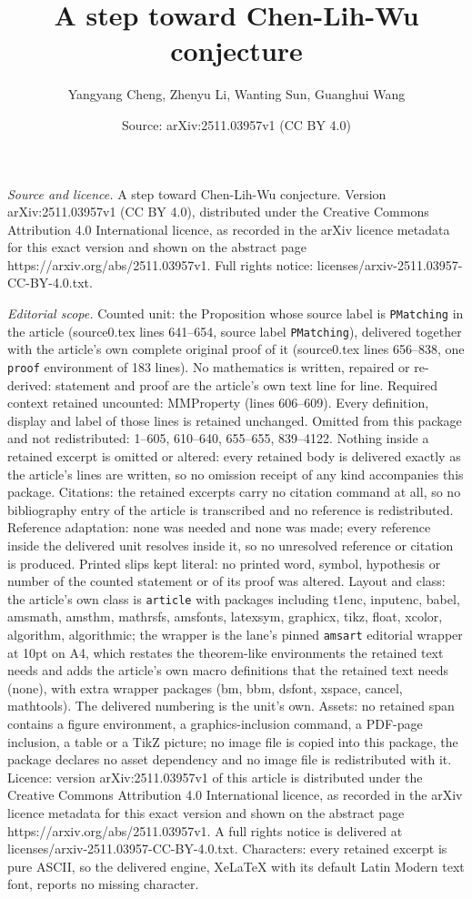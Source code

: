 \documentclass[10pt,a4paper]{amsart}
\title[A step toward Chen-Lih-Wu conjecture]{A step toward Chen-Lih-Wu conjecture}
\author{Yangyang Cheng, Zhenyu Li, Wanting Sun, Guanghui Wang}
\date{Source: arXiv:2511.03957v1 (CC BY 4.0)}
\begin{document}
\maketitle

\noindent\emph{Source and licence.} A step toward Chen-Lih-Wu conjecture. Version arXiv:2511.03957v1 (CC BY 4.0), distributed under the Creative Commons Attribution 4.0 International licence, as recorded in the arXiv licence metadata for this exact version and shown on the abstract page https://arxiv.org/abs/2511.03957v1. Full rights notice: licenses/arxiv-2511.03957-CC-BY-4.0.txt.\par\smallskip

\noindent\textit{Editorial scope.} Counted unit: the Proposition whose source label is \texttt{PMatching} in the article (source0.tex lines 641--654, source label \texttt{PMatching}), delivered together with the article's own complete original proof of it (source0.tex lines 656--838, one \texttt{proof} environment of 183 lines). No mathematics is written, repaired or re-derived: statement and proof are the article's own text line for line. Required context retained uncounted: MMProperty (lines 606--609). Every definition, display and label of those lines is retained unchanged. Omitted from this package and not redistributed: 1--605, 610--640, 655--655, 839--4122. Nothing inside a retained excerpt is omitted or altered: every retained body is delivered exactly as the article's lines are written, so no omission receipt of any kind accompanies this package. Citations: the retained excerpts carry no citation command at all, so no bibliography entry of the article is transcribed and no reference is redistributed. Reference adaptation: none was needed and none was made; every reference inside the delivered unit resolves inside it, so no unresolved reference or citation is produced. Printed slips kept literal: no printed word, symbol, hypothesis or number of the counted statement or of its proof was altered. Layout and class: the article's own class is \texttt{article} with packages including t1enc, inputenc, babel, amsmath, amsthm, mathrsfs, amsfonts, latexsym, graphicx, tikz, float, xcolor, algorithm, algorithmic; the wrapper is the lane's pinned \texttt{amsart} editorial wrapper at 10pt on A4, which restates the theorem-like environments the retained text needs and adds the article's own macro definitions that the retained text needs (none), with extra wrapper packages (bm, bbm, dsfont, xspace, cancel, mathtools). The delivered numbering is the unit's own. Assets: no retained span contains a figure environment, a graphics-inclusion command, a PDF-page inclusion, a table or a TikZ picture; no image file is copied into this package, the package declares no asset dependency and no image file is redistributed with it. Licence: version arXiv:2511.03957v1 of this article is distributed under the Creative Commons Attribution 4.0 International licence, as recorded in the arXiv licence metadata for this exact version and shown on the abstract page https://arxiv.org/abs/2511.03957v1. A full rights notice is delivered at licenses/arxiv-2511.03957-CC-BY-4.0.txt. Characters: every retained excerpt is pure ASCII, so the delivered engine, XeLaTeX with its default Latin Modern text font, reports no missing character.
\end{document}
